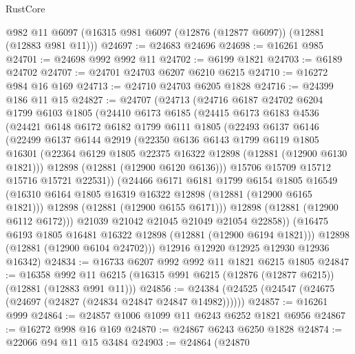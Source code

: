 \begin{lexlean}{RustCore}
\begin{coremodule}
    @982
    @11
    @6097
    (@16315 @981 @6097 (@12876 (@12877 @6097)) (@12881 (@12883 @981 @11)))
@24697 := @24683 @24696
@24698 := @16261 @985
@24701 := @24698 @992 @992 @11
@24702 := @6199 @1821
@24703 := @6189 @24702
@24707 := @24701 @24703 @6207 @6210 @6215
@24710 := @16272 @984 @16 @169
@24713 := @24710 @24703 @6205 @1828
@24716 := @24399 @186 @11 @15
@24827 := @24707
    (@24713
      (@24716
        @6187
        @24702
        @6204
        @1799
        @6103
        @1805
        (@24410
          @6173
          @6185
          (@24415
            @6173
            @6183
            @4536
            (@24421
              @6148
              @6172
              @6182
              @1799
              @6111
              @1805
              (@22493
                @6137
                @6146
                (@22499
                  @6137
                  @6144
                  @2919
                  (@22350
                    @6136
                    @6143
                    @1799
                    @6119
                    @1805
                    @16301
                    (@22364 @6129 @1805 @22375 @16322 @12898 (@12881 (@12900 @6130 @1821)))
                    @12898
                    (@12881 (@12900 @6120 @6136)))
                  @15706
                  @15709
                  @15712
                  @15716
                  @15721
                  @22531))
              (@24466
                @6171
                @6181
                @1799
                @6154
                @1805
                @16549
                (@16310 @6164 @1805 @16319 @16322 @12898 (@12881 (@12900 @6165 @1821)))
                @12898
                (@12881 (@12900 @6155 @6171)))
              @12898
              (@12881 (@12900 @6112 @6172)))
            @21039
            @21042
            @21045
            @21049
            @21054
            @22858))
        (@16475 @6193 @1805 @16481 @16322 @12898 (@12881 (@12900 @6194 @1821)))
        @12898
        (@12881 (@12900 @6104 @24702)))
      @12916
      @12920
      @12925
      @12930
      @12936
      @16342)
@24834 := @16733 @6207 @992 @992 @11 @1821 @6215 @1805
@24847 := @16358
    @992
    @11
    @6215
    (@16315 @991 @6215 (@12876 (@12877 @6215)) (@12881 (@12883 @991 @11)))
@24856 := @24384 (@24525 (@24547 (@24675 (@24697 (@24827 (@24834 @24847 @24847 @14982))))))
@24857 := @16261 @999
@24864 := @24857 @1006 @1099 @11 @6243 @6252 @1821 @6956
@24867 := @16272 @998 @16 @169
@24870 := @24867 @6243 @6250 @1828
@24874 := @22066 @94 @11 @15 @3484
@24903 := @24864
    (@24870

\end{coremodule}
\end{lexlean}
